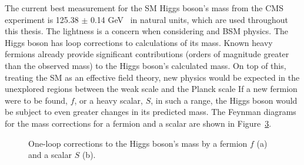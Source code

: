 The current best measurement for the \ac{SM} Higgs boson’s mass from the \ac{CMS} experiment is 125.38 $\pm$ 0.14 GeV~\cite{CMS:2020xrn} in natural units, which are used throughout this thesis.
The lightness is a concern when considering  and \ac{BSM} physics. 
The Higgs boson has loop corrections to calculations of its mass. 
Known heavy fermions already provide significant contributions (orders of magnitude greater than the observed mass) to the Higgs boson’s calculated mass. 
On top of this, treating the \ac{SM} as an effective field theory, new physics would be expected in the unexplored regions between the weak scale and the Planck scale
If a new fermion were to be found, $f$, or a heavy scalar, $S$, in such a range, the Higgs boson would be subject to even greater changes in its predicted mass. 
The Feynman diagrams for the mass corrections for a fermion and a scalar are shown in Figure~\ref{fig:Higgs_One_Loop_Corrections}.

\begin{figure}[H]
\centering
    \begin{subfigure}[b]{0.4\textwidth}
    \centering
    \caption{}
    \label{fig:corr_fermion}
    \end{subfigure}
    \begin{subfigure}[b]{0.4\textwidth}
    \centering
    \caption{}
    \label{fig:corr_scalar}
    \end{subfigure}
    \caption{One-loop corrections to the Higgs boson's mass by a fermion $f$ (a) and a scalar $S$ (b).}
    \label{fig:Higgs_One_Loop_Corrections}
\end{figure}

